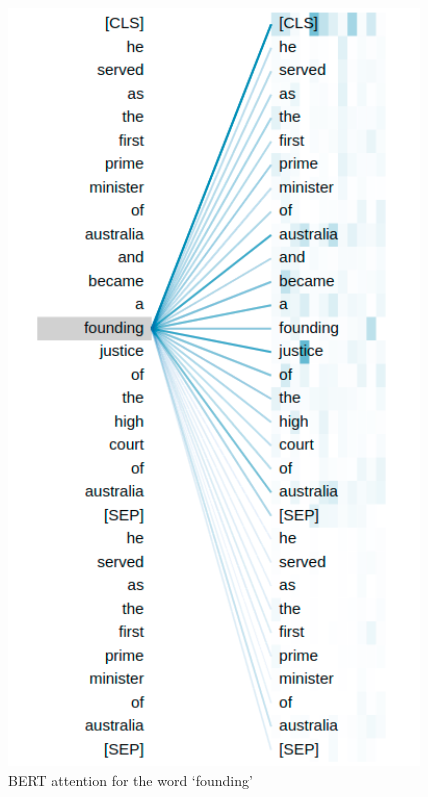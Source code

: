     \begin{figure}
    \begin{center}
    \advance\leftskip-3cm
    \advance\rightskip-3cm
    \includegraphics[keepaspectratio=true,width=0.5\vsize]{images/imojie/founding_cut.png}
    \caption{BERT attention for the word `founding'}
    \label{fig:founding}
    \end{center}
    \end{figure}
       
